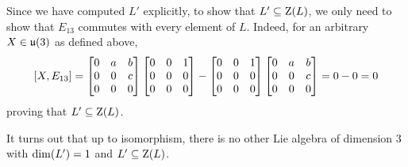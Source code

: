 \begin{boxexample}
    Since we have computed $L'$ explicitly, to show that $L' \subseteq \operatorname{Z}\!\left( L \right)$, we only need to show that $E_{13}$ commutes with every element of $L$. Indeed, for an arbitrary $X \in \mathfrak{u}\!\left( 3 \right)$ as defined above,
    \begin{align*}
        \left[ X, E_{13} \right] = \begin{bmatrix}
            0 & a & b \\
            0 & 0 & c \\
            0 & 0 & 0
        \end{bmatrix} \begin{bmatrix}
            0 & 0 & 1 \\
            0 & 0 & 0 \\
            0 & 0 & 0
        \end{bmatrix} - \begin{bmatrix}
            0 & 0 & 1 \\
            0 & 0 & 0 \\
            0 & 0 & 0
        \end{bmatrix} \begin{bmatrix}
            0 & a & b \\
            0 & 0 & c \\
            0 & 0 & 0
        \end{bmatrix}
        = 0 - 0 = 0
    \end{align*}
    proving that $L' \subseteq \operatorname{Z}\!\left( L \right)$.
\end{boxexample}

It turns out that up to isomorphism, there is no other Lie algebra of dimension $3$ with $\dim\!\left( L' \right) = 1$ and $L' \subseteq \operatorname{Z}\!\left( L \right)$.

